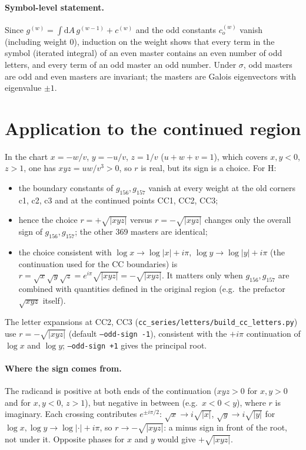 \documentclass[11pt]{article}
\newcommand{\dd}{\mathrm{d}}
\begin{document}
\paragraph{Symbol-level statement.} Since $g^{(w)}=\int \dd A\, g^{(w-1)} + c^{(w)}$ and the odd
constants $c^{(w)}_{o}$ vanish (including weight 0), induction on the weight shows that every
term in the symbol (iterated integral) of an even master contains an even number of odd
letters, and every term of an odd master an odd number. Under $\sigma$, odd masters are odd and even masters are invariant;
the masters are Galois eigenvectors with eigenvalue $\pm1$.

\section{Application to the continued region}
In the chart $x=-w/v$, $y=-u/v$, $z=1/v$ ($u+w+v=1$), which covers $x,y<0$, $z>1$, one has
$xyz = uw/v^3>0$, so $r$ is real, but its sign is a choice. For H:
\begin{itemize}
\item the boundary constants of $g_{156},g_{157}$ vanish at every weight at the old corners
  c1, c2, c3 and at the continued points CC1, CC2, CC3;
\item hence the choice $r=+\sqrt{|xyz|}$ versus $r=-\sqrt{|xyz|}$ changes only the overall sign
  of $g_{156},g_{157}$; the other 369 masters are identical;
\item the choice consistent with $\log x\to\log|x|+i\pi$, $\log y\to\log|y|+i\pi$ (the
  continuation used for the CC boundaries) is
  $r=\sqrt{x}\sqrt{y}\sqrt{z}=e^{i\pi}\sqrt{|xyz|}=-\sqrt{|xyz|}$.
  It matters only when $g_{156},g_{157}$ are combined with quantities defined in the original
  region (e.g.\ the prefactor $\sqrt{xyz}$ itself).
\end{itemize}
The letter expansions at CC2, CC3 (\texttt{cc\_series/letters/build\_cc\_letters.py}) use
$r=-\sqrt{|xyz|}$ (default \texttt{--odd-sign -1}), consistent with the $+i\pi$ continuation of
$\log x$ and $\log y$; \texttt{--odd-sign +1} gives the principal root.

\paragraph{Where the sign comes from.} The radicand is positive at both ends of the
continuation ($xyz>0$ for $x,y>0$ and for $x,y<0$, $z>1$), but negative in between (e.g.\ $x<0<y$),
where $r$ is imaginary. Each crossing contributes $e^{\pm i\pi/2}$:
$\sqrt{x}\to i\sqrt{|x|}$, $\sqrt{y}\to i\sqrt{|y|}$ for $\log x,\log y\to\log|\cdot|+i\pi$, so
$r\to -\sqrt{|xyz|}$: a minus sign in front of the root, not under it. Opposite phases for $x$ and
$y$ would give $+\sqrt{|xyz|}$.
\end{document}
